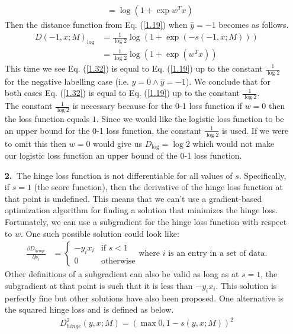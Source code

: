 \documentclass [10pt]{article}
\begin{document}
\begin{enumerate}
\begin{align}
		&= \log(1+\exp{w^{T}x}) \nonumber
	\end{align}
	Then the distance function from Eq. (\ref{1.19}) when $\hat{y} = -1$ becomes as follows.
	\begin{align}
		D(-1,x;M)_{\log} &= \frac{1}{\log2}\log(1+\exp{(-s(-1,x;M))}) \nonumber \\
		&= \frac{1}{\log2}\log(1+\exp{(w^{T}x)}) \nonumber
	\end{align}
	This time we see Eq. (\ref{1.32}) is equal to Eq. (\ref{1.19}) up to the constant $\frac{1}{\log2}$ for the negative labelling case (i.e. $y = 0 \land \hat{y} = -1$). We conclude that for both cases Eq. (\ref{1.32}) is equal to Eq. (\ref{1.19}) up to the constant $\frac{1}{\log2}$.\\
	The constant $\frac{1}{\log2}$ is necessary because for the 0-1 loss function if $w = 0$ then the loss function equals $1$. Since we would like the logistic loss function to be an upper bound for the 0-1 loss function, the constant $\frac{1}{\log2}$ is used. If we were to omit this then $w = 0$ would give us $D_{\log} = \log2$ which would not make our logistic loss function an upper bound of the 0-1 loss function.
	\item[\textbf{2.$\>$}]The hinge loss function is not differentiable for all values of $s$. Specifically, if $s = 1$ (the score function), then the derivative of the hinge loss function at that point is undefined. This means that we can't use a gradient-based optimization algorithm for finding a solution that minimizes the hinge loss. Fortunately, we can use a subgradient for the hinge loss function with respect to $w$. One such possible solution could look like:
	\begin{align}
		\frac{\partial D_{hinge}}{\partial s_{i}} &= \begin{cases}
			-y_{i}x_{i} & \text{if $s < 1$} \nonumber \\
			0 & \text{otherwise} \nonumber
		\end{cases} \text{where $i$ is an entry in a set of data.}
	\end{align}
	Other definitions of a subgradient can also be valid as long as at $s = 1$, the subgradient at that point is such that it is less than $-y_{i}x_{i}$. This solution is perfectly fine but other solutions have also been proposed. One alternative is the squared hinge loss and is defined as below.
	\begin{align}
		D_{hinge}^{2}(y,x;M) = (\max{0,1-s(y,x;M)})^{2} \nonumber
	\end{align}

\end{enumerate}
\end{document}
